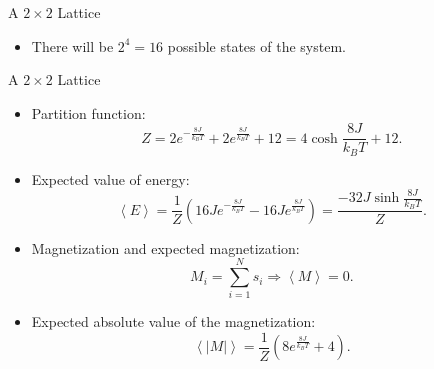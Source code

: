 \documentclass{beamer} %
\begin{document}
\begin{frame}{A $2\times2$ Lattice}
\begin{itemize}
\item There will be $2^{4}=16$ possible states of the system.
\end{itemize}
\begin{figure}[ht]
\begin{center}
\label{fig:spins2x2}
\end{center}
\end{figure}
\end{frame}

\begin{frame}{A $2\times2$ Lattice}
\begin{itemize}
\item Partition function:
\begin{equation}
\label{eq:partition2x2}
Z=2e^{-\frac{8J}{k_{B}T}}+2e^{\frac{8J}{k_{B}T}}+12 = 4\cosh{\frac{8J}{k_{B}T}}+12.
\end{equation}
\item Expected value of energy:
\begin{equation}
\label{eq:expe2x2}
\left<E\right> = \frac{1}{Z}\left(16Je^{-\frac{8J}{k_{B}T}}-16Je^{\frac{8J}{k_{B}T}}\right) = \frac{-32J\sinh{\frac{8J}{k_{B}T}}}{Z}.
\end{equation}
\item Magnetization and expected magnetization:
\begin{equation}
\label{eq:mag}
M_{i}=\sum_{i=1}^{N}s_{i} \Rightarrow \left<M\right>=0.
\end{equation}
\item Expected absolute value of the magnetization:
\begin{equation}
\label{eq:expabsm2x2}
\left<\left|M\right|\right> = \frac{1}{Z}\left(8e^{\frac{8J}{k_{B}T}}+4\right).
\end{equation}
\end{itemize}
\end{frame}
\end{document}
